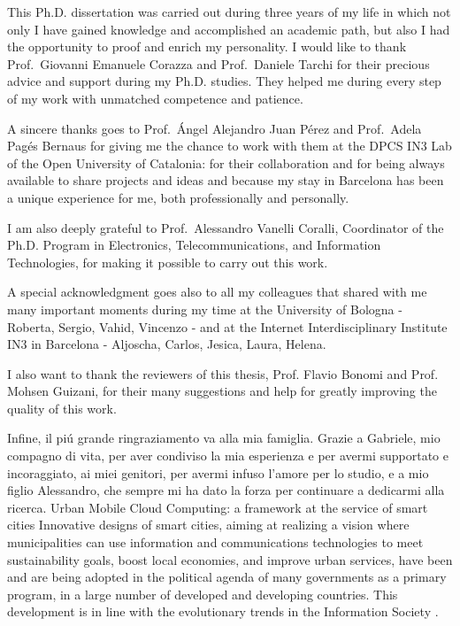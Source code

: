 \documentclass[twoside,openright]{report}
\makeatletter
\let\LaTeXStandardPart\part%
\newcommand{\unstarredpart@@noopt}[1]{%
  \unstarredpart@@opt[#1]{#1}%
}%
\newcommand{\unstarredpart@@opt}[2][]{%
  \cleardoublepage%
  \begingroup%
  \let\newpage\relax%
  \LaTeXStandardPart[#1]{#2}%
  \endgroup%
}%
\newcommand{\starredpart}[1]{%
  \LaTeXStandardPart*{#1}%
}%
\newcommand{\unstarredpart}{%
  \@ifnextchar[{\unstarredpart@@opt}{\unstarredpart@@noopt}%
}%
\renewcommand{\part}{%
  \@ifstar{\starredpart}{\unstarredpart}%
}%
\makeatother
\begin{document}
This Ph.D. dissertation was carried out during three years of my life in which not only I have gained knowledge and accomplished an academic path, but also I had the opportunity to proof and enrich my personality.
I would like to thank Prof.~Giovanni Emanuele Corazza  and Prof.~Daniele Tarchi for their precious advice and support during my Ph.D. studies. They helped me during every step of my work with unmatched competence and patience. 

A sincere thanks goes to Prof.~\'Angel Alejandro Juan P\'erez and Prof.~Adela Pag\'es Bernaus for giving me the chance to work with them at the DPCS IN3 Lab of the Open University of Catalonia: for their collaboration and for being always available to share projects and ideas and because my stay in Barcelona has been a unique experience for me, both professionally and personally. 

I am also deeply grateful to Prof.~Alessandro Vanelli Coralli, Coordinator of the Ph.D. Program in Electronics, Telecommunications, and Information Technologies, for making it possible to carry out this work. 
 
A special acknowledgment goes also to all my colleagues that shared with me many important moments during my time at the University of Bologna - Roberta, Sergio, Vahid, Vincenzo - and at the Internet Interdisciplinary Institute IN3 in Barcelona - Aljoscha, Carlos, Jesica, Laura, Helena.

I also want to thank the reviewers of this thesis, Prof. Flavio Bonomi and Prof. Mohsen Guizani, for their many suggestions and help for greatly improving the quality of this work.

Infine, il pi\'u grande ringraziamento va alla mia famiglia. Grazie a Gabriele, mio compagno di vita, per aver condiviso la mia esperienza e per avermi supportato e incoraggiato, ai miei genitori, per avermi infuso l'amore per lo studio, e a mio figlio Alessandro, che sempre mi ha dato la forza per continuare a dedicarmi alla ricerca.
\afterpreface
\part{Urban Mobile Cloud Computing: a framework at the service of smart cities}
Innovative designs of smart cities, aiming at realizing a vision where municipalities can use information and communications technologies to meet sustainability goals, boost local economies, and improve urban services, have been and are being adopted in the political agenda of many governments as a primary program, in a large number of developed and developing countries. This development is in line with the evolutionary trends in the Information Society \cite{technologyAsANeed2010}.
\end{document}
